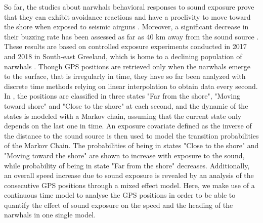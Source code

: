 \documentclass[11pt]{article}
\newcommand {\1}{\mathbb{1}}
\theoremstyle{definition}
\theoremstyle{remark}
\theoremstyle{remark}
\begin{document}
So far, the studies about narwhals behavioral responses to sound exposure prove that they can exhibit avoidance reactions and have a proclivity to move toward the shore when exposed to seismic airguns \cite{heide-jorgensen_behavioral_2021}. Moreover, a significant decrease in their buzzing rate has been assessed as far as 40 km away from the sound source \cite{tervo_narwhals_2021}. These results are based on controlled exposure experiments conducted in 2017 and 2018 in South-east Greeland, which is home to a declining population of narwhals \cite{garde_biological_2022}.  Though GPS positions are retrieved only when the narwhals emerge to the surface, that is irregularly in time, they have so far been analyzed with discrete time methods relying on linear interpolation to obtain data every second. In \cite{heide-jorgensen_behavioral_2021}, the positions are classified in three states "Far from the shore", "Moving toward shore" and "Close to the shore" at each second, and the dynamic of the states is modeled with a Markov chain, assuming that the current state only depends on the last one in time. An exposure covariate defined as the inverse of the distance to the sound source is then used to model the transition probabilities of the Markov Chain. The probabilities of being in states "Close to the shore" and "Moving toward the shore" are shown to increase with exposure to the sound, while probability of being in state "Far from the shore" decreases. Additionally, an overall speed increase due to sound exposure is revealed by an analysis of the consecutive GPS positions through a mixed effect model. 
Here, we  make use of a continuous time model to analyse the GPS positions in order to be able to quantify the effect of sound exposure on the speed and the heading of the narwhals in one single model. \\
\end{document}

